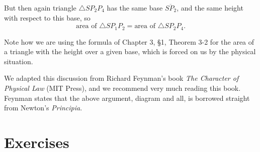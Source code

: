 \documentclass[12pt]{book} %
\begin{document}

But then again triangle $\triangle SP_2P_4$ has the same base $\overline{SP_2}$, and the same height with respect to this base, so
\[
\text{area of }\triangle SP_1P_2=\text{area of }\triangle SP_2P_4.
\]

Note how we are using the formula of Chapter 3, \S 1, Theorem 3-2 for the area of a triangle with the height over a given base, which is forced on us by the physical situation.

We adapted this discussion from Richard Feynman's book \textit{The Character of Physical Law} (MIT Press), and we recommend very much reading this book. Feynman states that the above argument, diagram and all, is borrowed straight from Newton's \textit{Principia}.

\section*{Exercises}
\end{document}
